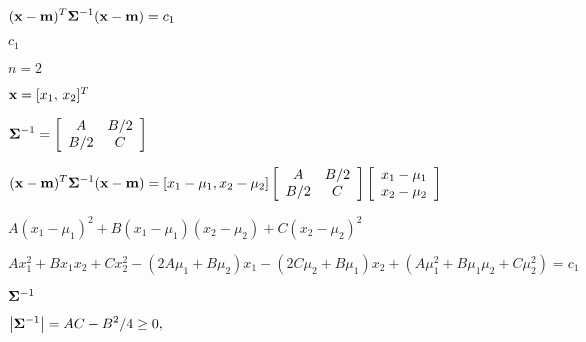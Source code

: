 \documentclass{article}
\def\lthtmlcheckvsize{\ifdim\ht\sizebox<\vsize 
  \ifdim\wd\sizebox<\hsize\expandafter\hfill\fi \expandafter\vfill
  \else\expandafter\vss\fi}%
\begin{document}
{\newpage\clearpage
{}%
$\displaystyle ({\bf x}-{\bf m})^T {\bf\Sigma}^{-1} ({\bf x}-{\bf m}) = c_1$%
\lthtmlindisplaymathZ
\lthtmlcheckvsize\clearpage}

{\newpage\clearpage
{}%
$ c_1$%
\lthtmlindisplaymathZ
\lthtmlcheckvsize\clearpage}

{\newpage\clearpage
{}%
$ n=2$%
\lthtmlindisplaymathZ
\lthtmlcheckvsize\clearpage}

{\newpage\clearpage
{}%
$ {\bf x}=[x_1,\,x_2]^T$%
\lthtmlindisplaymathZ
\lthtmlcheckvsize\clearpage}

{\newpage\clearpage
{}%
$\displaystyle {\bf\Sigma}^{-1}=\left[ \begin{array}{cc} A & B/2 \\B/2 & C \end{array} \right]$%
\lthtmlindisplaymathZ
\lthtmlcheckvsize\clearpage}

{\newpage\clearpage
{}%
$\displaystyle ({\bf x}-{\bf m})^T {\bf\Sigma}^{-1} ({\bf x}-{\bf m})
=[x_1-\mu_1, x_2-\mu_2]
\left[ \begin{array}{cc} A & B/2 \\B/2 & C \end{array} \right]
\left[ \begin{array}{c} x_1-\mu_1 \\x_2-\mu_2 \end{array} \right]$%
\lthtmlindisplaymathZ
\lthtmlcheckvsize\clearpage}

{\newpage\clearpage
{}%
$\displaystyle A(x_1-\mu_1)^2+B(x_1-\mu_1)(x_2-\mu_2)+C(x_2-\mu_2)^2$%
\lthtmlindisplaymathZ
\lthtmlcheckvsize\clearpage}

{\newpage\clearpage
{}%
$\displaystyle Ax^2_1+Bx_1x_2+Cx_2^2-(2A\mu_1+B\mu_2)x_1-(2C\mu_2+B\mu_1)x_2
+(A\mu_1^2+B\mu_1\mu_2+C\mu_2^2)=c_1$%
\lthtmlindisplaymathZ
\lthtmlcheckvsize\clearpage}

{\newpage\clearpage
{}%
$ {\bf\Sigma} ^{-1}$%
\lthtmlindisplaymathZ
\lthtmlcheckvsize\clearpage}

{\newpage\clearpage
{}%
$\displaystyle \left| {\bf\Sigma}^{-1} \right| = AC-B^2/4 \ge 0,
\;\;\;\;\;$%
\lthtmlindisplaymathZ
\lthtmlcheckvsize\clearpage}
\end{document}
